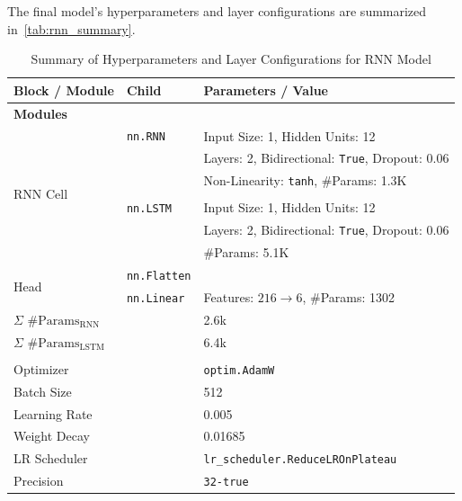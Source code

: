 The final model's hyperparameters and layer configurations are summarized in~\autoref{tab:rnn_summary}.
\begin{table}[H]
    \centering
    \caption{Summary of Hyperparameters and Layer Configurations for RNN Model}
    \label{tab:rnn_summary}
    \small
    \begin{tabular}{@{}lll@{}}
    \textbf{Block / Module}               & \textbf{Child}        & \textbf{Parameters / Value}            \\ \midrule
    \multicolumn{3}{l}{\textbf{Modules}}                                                     \\ \midrule
    \multirow{7}{*}{RNN Cell}
    & \texttt{nn.RNN} & Input Size: 1, Hidden Units: 12 \\
    & & Layers: 2, Bidirectional: \texttt{True}, Dropout: 0.06 \\
    & & Non-Linearity: \texttt{tanh}, \#Params: 1.3K \\
    & & \\
    & \texttt{nn.LSTM} & Input Size: 1, Hidden Units: 12 \\
    & & Layers: 2, Bidirectional: \texttt{True}, Dropout: 0.06 \\
    & & \#Params: 5.1K \\
    \midrule
    \multirow{2}{*}{Head}
    & \texttt{nn.Flatten}          &             \\
    & \texttt{nn.Linear}          & Features: \( 216 \rightarrow 6\), \#Params: 1302 \\
    \midrule[0.1pt]
    \addlinespace[0.5cm]
    \( \Sigma \) \#\(\text{Params}_{\text{RNN}}  \)               & & 2.6k\\
    \( \Sigma \) \#\(\text{Params}_{\text{LSTM}}  \)               & & 6.4k\\
    \bottomrule

    \addlinespace[1cm]
    \multicolumn{3}{l}{\textbf{Non-Layer Hyperparameters}}                                       \\ \midrule
    Optimizer                            &                           & \texttt{optim.AdamW} \\
    Batch Size                           &                           & 512                       \\
    Learning Rate                        &                           & 0.005                     \\
    Weight Decay                         &                           & 0.01685                   \\
    LR Scheduler                         &                           & \texttt{lr\_scheduler.ReduceLROnPlateau}\\
    Precision                            &                           & \texttt{32-true}     \\
    \bottomrule
    \end{tabular}%
\end{table}
